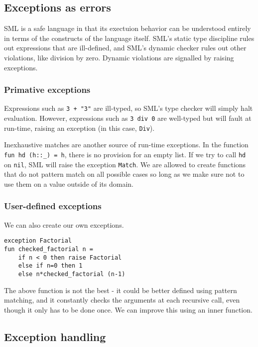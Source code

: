 \documentclass[11pt]{article}
\begin{document}
\subsection{Exceptions as errors}
SML is a safe language in that its exectuion behavior can be understood entirely in terms of the constructs of the language itself. SML's static type discipline rules out expressions that are ill-defined, and SML's dynamic checker rules out other violations, like division by zero. Dynamic violations are signalled by raising exceptions.

\subsubsection{Primative exceptions}

Expressions such as \verb~3 + "3"~ are ill-typed, so SML's type checker will simply halt evaluation. However, expressions such as \verb~3 div 0~ are well-typed but will fault at run-time, raising an exception (in this case, \verb~Div~). 

Inexhaustive matches are another source of run-time exceptions. In the function \verb~fun hd (h::_) = h~, there is no provision for an empty list. If we try to call \verb~hd~ on \verb~nil~, SML will raise the exception \verb~Match~. We are allowed to create functions that do not pattern match on all possible cases so long as we make sure not to use them on a value outside of its domain. 

\subsubsection{User-defined exceptions}

We can also create our own exceptions. 

\begin{verbatim}
exception Factorial
fun checked_factorial n =
    if n < 0 then raise Factorial
    else if n=0 then 1
    else n*checked_factorial (n-1)
\end{verbatim}

The above function is not the best - it could be better defined using pattern matching, and it constantly checks the arguments at each recursive call, even though it only has to be done once. We can improve this using an inner function.

\subsection{Exception handling}
\end{document}
